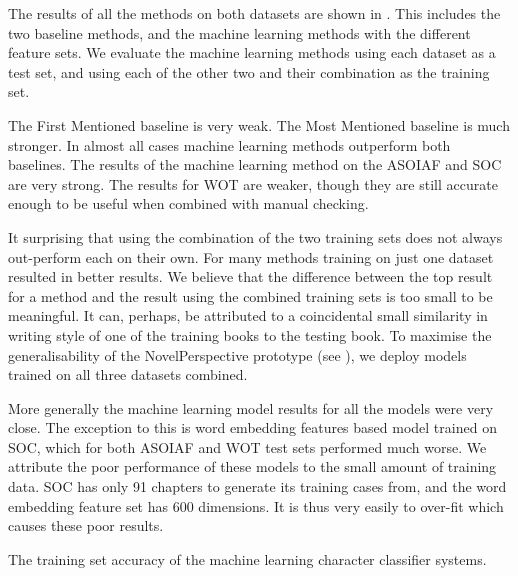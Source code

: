 \documentclass[11pt,a4paper]{article}
\begin{document}
The results of all the methods on both datasets are shown in .
This includes the two baseline methods, and the machine learning methods with the different feature sets.
We evaluate the machine learning methods using each dataset as a test set, and using each of the other two and their combination as the training set.

The First Mentioned baseline is very weak.
The Most Mentioned baseline is much stronger.
In almost all cases machine learning methods outperform both baselines.
The results of the machine learning method on the ASOIAF and SOC are very strong.
The results for WOT are weaker, though they are still accurate enough to be useful when combined with manual checking.


It surprising that using the combination of the two training sets does not always out-perform each on their own.
For many methods training on just one dataset resulted in better results.
We believe that the difference between the top result for a method and the result using the combined training sets is too small to be meaningful.
It can, perhaps, be attributed to a coincidental small similarity in writing style of one of the training books to the testing book.
To maximise the generalisability of the NovelPerspective prototype (see ), we deploy models trained on all three datasets combined.

More generally the machine learning model results for all the models were very close.
The exception to this is word embedding features based model trained on SOC, which for both ASOIAF and WOT test sets performed much worse.
We attribute the poor performance of these models to the small amount of training data.
SOC has only 91 chapters to generate its training cases from, and the word embedding feature set has 600 dimensions.
It is thus very easily to over-fit which causes these poor results.


\begin{table}
	\begin{adjustbox}{max width=\columnwidth}
		\small
		
	\end{adjustbox}
	
	\caption{The training set accuracy of the machine learning character classifier systems.
	} \label{tbl:restrain}
\end{table}
\end{document}
